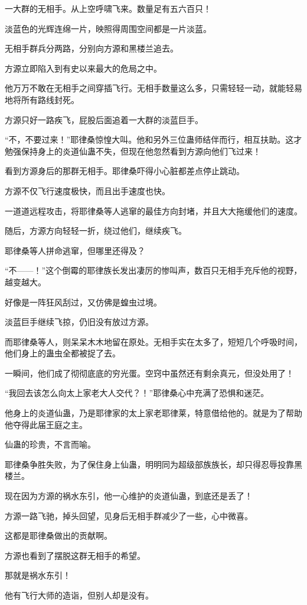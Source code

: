 \begin{this_body}
一大群的无相手。从上空呼啸飞来。数量足有五六百只！

淡蓝色的光辉连绵一片，映照得周围空间都是一片淡蓝。

无相手群兵分两路，分别向方源和黑楼兰追去。

方源立即陷入到有史以来最大的危局之中。

他万万不敢在无相手之间穿插飞行。无相手数量这么多，只需轻轻一动，就能轻易地将所有路线封死。

方源只好一路疾飞，屁股后面追着一大群的淡蓝巨手。

“不，不要过来！”耶律桑惊惶大叫。他和另外三位蛊师结伴而行，相互扶助。这才勉强保持身上的炎道仙蛊不失，但现在他忽然看到方源向他们飞过来！

看到方源身后的那群无相手。耶律桑吓得小心脏都差点停止跳动。

方源不仅飞行速度极快，而且出手速度也快。

一道道远程攻击，将耶律桑等人逃窜的最佳方向封堵，并且大大拖缓他们的速度。

随后，方源方向轻轻一折，绕过他们，继续疾飞。

耶律桑等人拼命逃窜，但哪里还得及？

“不——！”这个倒霉的耶律族长发出凄厉的惨叫声，数百只无相手充斥他的视野，越变越大。

好像是一阵狂风刮过，又仿佛是蝗虫过境。

淡蓝巨手继续飞掠，仍旧没有放过方源。

而耶律桑等人，则呆呆木木地留在原处。无相手实在太多了，短短几个呼吸时间，他们身上的蛊虫全都被捉了去。

一瞬间，他们成了彻彻底底的穷光蛋。空窍中虽然还有剩余真元，但没处用了！

“我回去该怎么向太上家老大人交代？！”耶律桑心中充满了恐惧和迷茫。

他身上的炎道仙蛊，乃是耶律家的太上家老耶律莱，特意借给他的。就是为了帮助他夺得此届王庭之主。

仙蛊的珍贵，不言而喻。

耶律桑争胜失败，为了保住身上仙蛊，明明同为超级部族族长，却只得忍辱投靠黑楼兰。

现在因为方源的祸水东引，他一心维护的炎道仙蛊，到底还是丢了！

方源一路飞驰，掉头回望，见身后无相手群减少了一些，心中微喜。

这都是耶律桑做出的贡献啊。

方源也看到了摆脱这群无相手的希望。

那就是祸水东引！

他有飞行大师的造诣，但别人却是没有。


\end{this_body}
